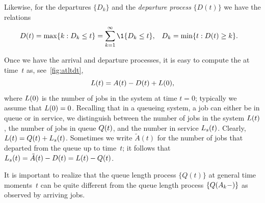 \documentclass[queueing-book.tex]{subfiles}
\begin{document}
Likewise, for the departures $\{D_{k}\}$ and the \emph{departure process} $\{D(t)\}$ we have the relations
\begin{align*}
 D(t) &= \max\{k : D_k \leq t\} = \sum_{k=1}^\infty \1{D_k \leq t}, &  D_{k} &=\min\{t: D(t) \geq k\}.
\end{align*}

Once we have the arrival and departure processes, it is easy to compute the  at time~$t$ as, see~\cref{fig:atltdt},
\begin{equation}\label{eq:14}
 L(t) = A(t) - D(t) + L(0),
\end{equation}
where $L(0)$ is the number of jobs in the system at time $t=0$; typically we assume that $L(0)=0$.
Recalling that in a queueing system, a job can either be in queue or in service, we distinguish between the number of jobs in the system $L(t)$, the number of jobs in queue $Q(t)$, and the number in service $L_s(t)$.
Clearly, $L(t) = Q(t) + L_s(t)$.  Sometimes we write  $\tilde A(t)$ for the number of jobs that departed from the queue up to time~$t$; it follows that $L_s(t) = \tilde A(t) - D(t) = L(t) - Q(t)$.


It is important to realize that the queue length process $\{Q(t)\}$ at general time moments~$t$ can be quite different from the queue length process $\{ Q(A_k-)\}$ as observed by arriving jobs.
\end{document}

